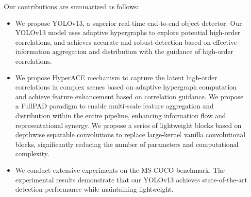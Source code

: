 Our contributions are summarized as follows:
\begin{itemize}
    \item We propose YOLOv13, a superior real-time end-to-end object detector. Our YOLOv13 model uses adaptive hypergraphs to explore potential high-order correlations, and achieves accurate and robust detection based on effective information aggregation and distribution with the guidance of high-order correlations.
    \item We propose HyperACE mechanism to capture the latent high-order correlations in complex scenes based on adaptive hypergraph computation and achieve feature enhancement based on correlation guidance. We propose a FullPAD paradigm to enable multi‑scale feature aggregation and distribution within the entire pipeline, enhancing information flow and representational synergy. We propose a series of lightweight blocks based on depthwise separable convolutions to replace large-kernel vanilla convolutional blocks, significantly reducing the number of parameters and computational complexity.
    \item We conduct extensive experiments on the MS COCO benchmark. The experimental results demonstrate that our YOLOv13 achieves state-of-the-art detection performance while maintaining lightweight.
\end{itemize}


